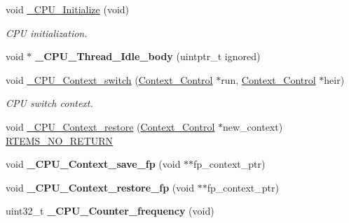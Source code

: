 \begin{DoxyCompactItemize}
void \mbox{\hyperlink{group__RTEMSScoreCPUEpiphany_ga869484e3d851b032fd826c69ff21fc72}{\+\_\+\+C\+P\+U\+\_\+\+Initialize}} (void)
\begin{DoxyCompactList}\small\item\em C\+PU initialization. \end{DoxyCompactList}\item 
\mbox{\label{group__RTEMSScoreCPUEpiphany_ga903a802003c95d6ef5206cb330424a1b}} 
void $\ast$ {\bfseries \+\_\+\+C\+P\+U\+\_\+\+Thread\+\_\+\+Idle\+\_\+body} (uintptr\+\_\+t ignored)
\item 
void \mbox{\hyperlink{group__RTEMSScoreCPUEpiphany_gaa9f8cc989454b28232e5375e30c90970}{\+\_\+\+C\+P\+U\+\_\+\+Context\+\_\+switch}} (\mbox{\hyperlink{structContext__Control}{Context\+\_\+\+Control}} $\ast$run, \mbox{\hyperlink{structContext__Control}{Context\+\_\+\+Control}} $\ast$heir)
\begin{DoxyCompactList}\small\item\em C\+PU switch context. \end{DoxyCompactList}\item 
void \mbox{\hyperlink{group__RTEMSScoreCPUEpiphany_ga80726ebfe00f31a88b086cc4474c472f}{\+\_\+\+C\+P\+U\+\_\+\+Context\+\_\+restore}} (\mbox{\hyperlink{structContext__Control}{Context\+\_\+\+Control}} $\ast$new\+\_\+context) \mbox{\hyperlink{group__RTEMSScoreBaseDefs_gaa2f0ed67aa174f684bb31b7e8bdb386f}{R\+T\+E\+M\+S\+\_\+\+N\+O\+\_\+\+R\+E\+T\+U\+RN}}
\item 
\mbox{\label{group__RTEMSScoreCPUEpiphany_ga8fb2beee7286aff3932e3dbfd732464a}} 
void {\bfseries \+\_\+\+C\+P\+U\+\_\+\+Context\+\_\+save\+\_\+fp} (void $\ast$$\ast$fp\+\_\+context\+\_\+ptr)
\item 
\mbox{\label{group__RTEMSScoreCPUEpiphany_ga3317a73cd2b81ff8fbba87e40ae8a3ec}} 
void {\bfseries \+\_\+\+C\+P\+U\+\_\+\+Context\+\_\+restore\+\_\+fp} (void $\ast$$\ast$fp\+\_\+context\+\_\+ptr)
\item 
\mbox{\label{group__RTEMSScoreCPUEpiphany_gaa675150e5d00169c99410a82011b6117}} 
uint32\+\_\+t {\bfseries \+\_\+\+C\+P\+U\+\_\+\+Counter\+\_\+frequency} (void)
\item 
\mbox{\label{group__RTEMSScoreCPUEpiphany_gac016ae4ed92ed2607bd65408a36d908b}} 

\end{DoxyCompactItemize}
